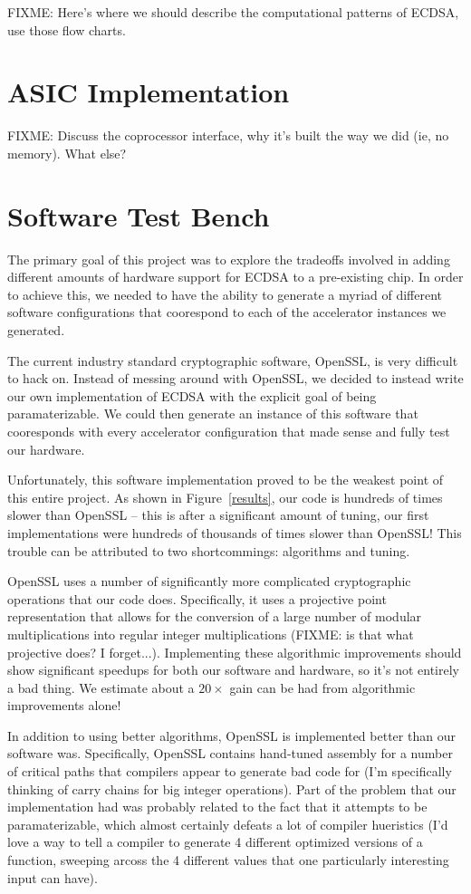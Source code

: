 \documentclass[twocolumn]{article}
\begin{document}
FIXME: Here's where we should describe the computational patterns of
ECDSA, use those flow charts.

\section{ASIC Implementation}

FIXME: Discuss the coprocessor interface, why it's built the way we
did (ie, no memory).  What else?

\section{Software Test Bench}

The primary goal of this project was to explore the tradeoffs involved
in adding different amounts of hardware support for ECDSA to a
pre-existing chip.  In order to achieve this, we needed to have the
ability to generate a myriad of different software configurations that
coorespond to each of the accelerator instances we generated.

The current industry standard cryptographic software, OpenSSL, is very
difficult to hack on.  Instead of messing around with OpenSSL, we
decided to instead write our own implementation of ECDSA with the
explicit goal of being paramaterizable.  We could then generate an
instance of this software that cooresponds with every accelerator
configuration that made sense and fully test our hardware.

Unfortunately, this software implementation proved to be the weakest
point of this entire project.  As shown in Figure~\ref{results}, our
code is hundreds of times slower than OpenSSL -- this is after a
significant amount of tuning, our first implementations were hundreds
of thousands of times slower than OpenSSL!  This trouble can be
attributed to two shortcommings: algorithms and tuning.

OpenSSL uses a number of significantly more complicated cryptographic
operations that our code does.  Specifically, it uses a projective
point representation that allows for the conversion of a large number
of modular multiplications into regular integer multiplications
(FIXME: is that what projective does? I forget...).  Implementing
these algorithmic improvements should show significant speedups for
both our software and hardware, so it's not entirely a bad thing.  We
estimate about a $20\times$ gain can be had from algorithmic
improvements alone!

In addition to using better algorithms, OpenSSL is implemented better
than our software was.  Specifically, OpenSSL contains hand-tuned
assembly for a number of critical paths that compilers appear to
generate bad code for (I'm specifically thinking of carry chains for
big integer operations).  Part of the problem that our implementation
had was probably related to the fact that it attempts to be
paramaterizable, which almost certainly defeats a lot of compiler
hueristics (I'd love a way to tell a compiler to generate 4 different
optimized versions of a function, sweeping arcoss the 4 different
values that one particularly interesting input can have).
\end{document}
